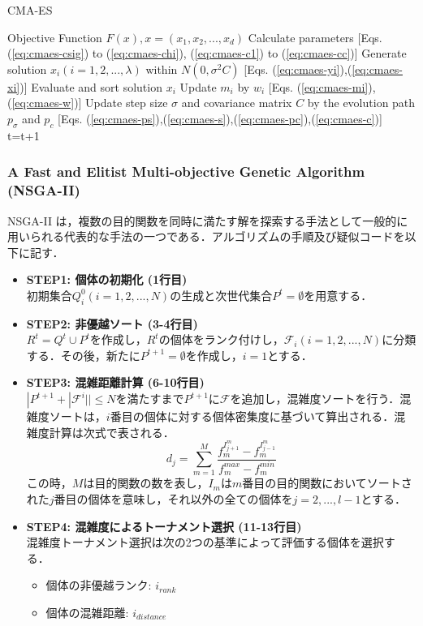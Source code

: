 \documentclass[a4j,11pt]{jarticle}
\begin{document}
\begin{algorithm}[H]
\caption{CMA-ES}
\label{code:cma-es}
\begin{algorithmic}[5]
\REQUIRE Objective Function $F(x), x=(x_1,x_2,...,x_d)$
\STATE Calculate parameters [Eqs. (\ref{eq:cmaes-csig}) to (\ref{eq:cmaes-chi}), (\ref{eq:cmaes-c1}) to (\ref{eq:cmaes-cc})]
\STATE Generate solution $x_i (i=1,2,...,\lambda)$ within $N(0, \sigma^2 C)$ [Eqs. (\ref{eq:cmaes-yi}),(\ref{eq:cmaes-xi})]
\ENDFOR
\STATE Evaluate and sort solution $x_i$
\STATE Update $m_i$ by $w_i$ [Eqs. (\ref{eq:cmaes-mi}),(\ref{eq:cmaes-w})]
\STATE Update step size $\sigma$ and covariance matrix $C$ by the evolution path $p_{\sigma}$ and $p_c$ [Eqs. (\ref{eq:cmaes-ps}),(\ref{eq:cmaes-s}),(\ref{eq:cmaes-pc}),(\ref{eq:cmaes-c})]
\ENDFOR
\STATE t=t+1
\ENDWHILE
\end{algorithmic}
\end{algorithm}

\subsubsection{A Fast and Elitist Multi-objective Genetic Algorithm (NSGA-II)}
\label{sss:nsga}
NSGA-II \cite{NSGAII} は，複数の目的関数を同時に満たす解を探索する手法として一般的に用いられる代表的な手法の一つである．アルゴリズムの手順及び疑似コードを以下に記す．

\begin{itemize}
\item {\bf STEP1: 個体の初期化 (1行目)} \\
初期集合$Q_i^0 (i=1,2,...,N)$の生成と次世代集合$P^t=\emptyset$を用意する．
\item {\bf STEP2: 非優越ソート (3-4行目)}\\
$R^t=Q^t \cup P^t$を作成し，$R^t$の個体をランク付けし，$\mathcal{F}_i (i=1,2,...,N)$に分類する．その後，新たに$P^{t+1}=\emptyset$を作成し，$i=1$とする．
\item {\bf STEP3: 混雑距離計算 (6-10行目)}\\
$|P^{t+1}+|\mathcal{F}^i||\leq N$を満たすまで$P^{t+1}$に$\mathcal{F}$を追加し，混雑度ソートを行う．混雑度ソートは，$i$番目の個体に対する個体密集度に基づいて算出される．混雑度計算は次式で表される．
\begin{equation}
\label{eq:nsga-crowd}
d_j = \sum_{m=1}^M \frac{f_m^{I^{m}_{j+1}}-f_m^{I^{m}_{j-1}}}{f_m^{max}-f_m^{min}}
\end{equation}
この時，$M$は目的関数の数を表し，$I_m$は$m$番目の目的関数においてソートされた$j$番目の個体を意味し，それ以外の全ての個体を$j=2,...,l-1$とする．
\item {\bf STEP4: 混雑度によるトーナメント選択 (11-13行目)}\\
混雑度トーナメント選択は次の2つの基準によって評価する個体を選択する．
\begin{itemize}
  \item 個体の非優越ランク: $i_{rank}$
  \item 個体の混雑距離: $i_{distance}$
\end{itemize}
\end{itemize}
\end{document}
